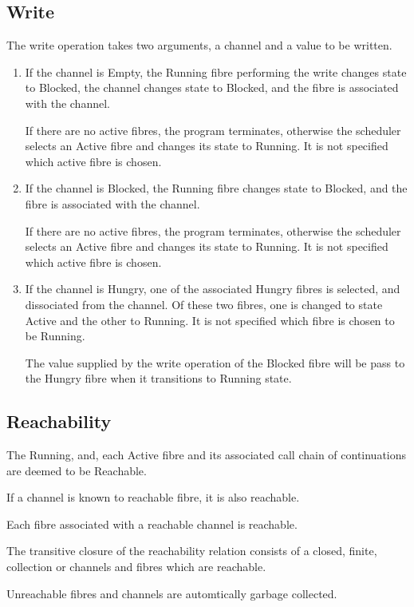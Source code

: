 \documentclass{article}
\begin{document}
\subsection{Write}
The write operation takes two arguments, a channel and a value
to be written.

\begin{enumerate}
\item If the channel is Empty, the Running fibre performing the write
changes state to Blocked, the channel changes state to Blocked,
and the fibre is associated with the channel.

If there are no active fibres, the program terminates,
otherwise the scheduler selects an Active fibre and
changes its state to Running.  It is not specified which active 
fibre is chosen.

\item If the channel is Blocked, the Running fibre changes state
to Blocked, and the fibre is associated with the channel.

If there are no active fibres, the program terminates,
otherwise the scheduler selects an Active fibre and
changes its state to Running.  It is not specified which active 
fibre is chosen.

\item If the channel is Hungry, one of the associated Hungry fibres
is selected, and dissociated from the channel. Of these two
fibres, one is changed to state Active and the other to Running.
It is not specified which fibre is chosen to be Running.

The value supplied by the write operation of the Blocked
fibre will be pass to the Hungry fibre when it transitions
to Running state.
\end{enumerate}

\subsection{Reachability}
The Running, and, each Active fibre and its associated call chain of 
continuations are deemed to be Reachable.

If a channel is known to reachable fibre, it is also reachable.

Each fibre associated with a reachable channel is reachable.

The transitive closure of the reachability relation consists
of a closed, finite, collection or channels and fibres which
are reachable.

Unreachable fibres and channels are automtically garbage
collected.
\end{document}
